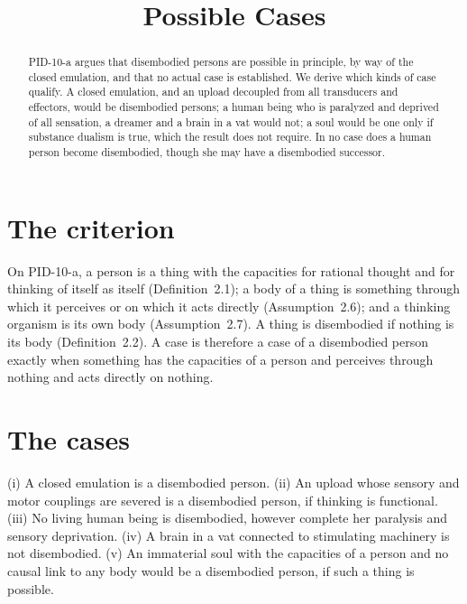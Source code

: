\documentclass{situationist-preprint}
\title{Possible Cases}
\begin{document}
\maketitle

\begin{abstract}
PID-10-a argues that disembodied persons are possible in principle, by way of the closed emulation, and that no actual case is established. We derive which kinds of case qualify. A closed emulation, and an upload decoupled from all transducers and effectors, would be disembodied persons; a human being who is paralyzed and deprived of all sensation, a dreamer and a brain in a vat would not; a soul would be one only if substance dualism is true, which the result does not require. In no case does a human person become disembodied, though she may have a disembodied successor.
\end{abstract}

\section{The criterion}

On PID-10-a, a person is a thing with the capacities for rational thought and for thinking of itself as itself (Definition~2.1); a body of a thing is something through which it perceives or on which it acts directly (Assumption~2.6); and a thinking organism is its own body (Assumption~2.7). A thing is disembodied if nothing is its body (Definition~2.2). A case is therefore a case of a disembodied person exactly when something has the capacities of a person and perceives through nothing and acts directly on nothing.

\section{The cases}

\begin{proposition}\label{p:cases}
(i) A closed emulation is a disembodied person. (ii) An upload whose sensory and motor couplings are severed is a disembodied person, if thinking is functional. (iii) No living human being is disembodied, however complete her paralysis and sensory deprivation. (iv) A brain in a vat connected to stimulating machinery is not disembodied. (v) An immaterial soul with the capacities of a person and no causal link to any body would be a disembodied person, if such a thing is possible.
\end{proposition}
\end{document}
